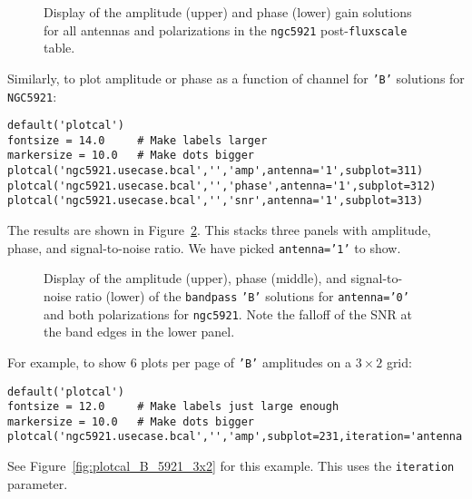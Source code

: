 \begin{figure}[h!]
\begin{center}
\caption{\label{fig:plotcal_G_5921} Display of the amplitude (upper)
and phase (lower) gain solutions for all antennas and polarizations 
in the {\tt ngc5921} post-{\tt fluxscale} table.} 
\hrulefill
\end{center}
\end{figure}


Similarly, to plot amplitude or phase as a function of channel for
{\tt 'B'} solutions for {\tt NGC5921}:
\small
\begin{verbatim}
default('plotcal')
fontsize = 14.0     # Make labels larger
markersize = 10.0   # Make dots bigger
plotcal('ngc5921.usecase.bcal','','amp',antenna='1',subplot=311)
plotcal('ngc5921.usecase.bcal','','phase',antenna='1',subplot=312)
plotcal('ngc5921.usecase.bcal','','snr',antenna='1',subplot=313)
\end{verbatim}
\normalsize
The results are shown in Figure~\ref{fig:plotcal_B_5921}.  This stacks
three panels with amplitude, phase, and signal-to-noise ratio.  We
have picked {\tt antenna='1'} to show.

\begin{figure}[h!]
\begin{center}
\caption{\label{fig:plotcal_B_5921} Display of the amplitude (upper),
phase (middle), and signal-to-noise ratio (lower) of the
{\tt bandpass} {\tt 'B'} solutions for {\tt antenna='0'} and both
polarizations for {\tt ngc5921}.  Note the falloff of the SNR at
the band edges in the lower panel.} 
\hrulefill
\end{center}
\end{figure}


For example, to show 6 plots per page of {\tt 'B'} amplitudes on a 
$3 \times 2$ grid:
\small
\begin{verbatim}
default('plotcal')
fontsize = 12.0     # Make labels just large enough
markersize = 10.0   # Make dots bigger
plotcal('ngc5921.usecase.bcal','','amp',subplot=231,iteration='antenna')
\end{verbatim}
\normalsize
See Figure~\ref{fig:plotcal_B_5921_3x2} for this example.  This uses
the {\tt iteration} parameter.

